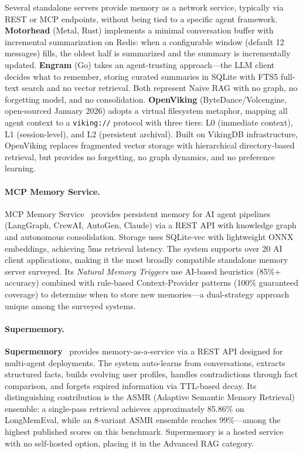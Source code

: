 Several standalone servers provide memory as a network service,
typically via REST or MCP endpoints, without being tied to a specific
agent framework. \textbf{Motorhead} (Metal, Rust) implements a
minimal conversation buffer with incremental summarization on Redis:
when a configurable window (default 12 messages) fills, the oldest
half is summarized and the summary is incrementally updated.
\textbf{Engram} (Go) takes an agent-trusting approach---the LLM
client decides what to remember, storing curated summaries in SQLite
with FTS5 full-text search and no vector retrieval. Both represent
Naive RAG with no graph, no forgetting model, and no consolidation.
\textbf{OpenViking} (ByteDance/Volcengine, open-sourced January 2026)
adopts a virtual filesystem metaphor, mapping all agent context to a
\texttt{viking://} protocol with three tiers: L0 (immediate context),
L1 (session-level), and L2 (persistent archival). Built on VikingDB
infrastructure, OpenViking replaces fragmented vector storage with
hierarchical directory-based retrieval, but provides no forgetting,
no graph dynamics, and no preference learning.

\paragraph{MCP Memory Service.}
MCP Memory Service~\cite{doobidoo2026mcp} provides persistent memory
for AI agent pipelines (LangGraph, CrewAI, AutoGen, Claude) via a REST
API with knowledge graph and autonomous consolidation.  Storage uses
SQLite-vec with lightweight ONNX embeddings, achieving 5ms retrieval
latency.  The system supports over 20 AI client applications, making it
the most broadly compatible standalone memory server surveyed.  Its
\emph{Natural Memory Triggers} use AI-based heuristics (85\%+ accuracy)
combined with rule-based Context-Provider patterns (100\% guaranteed
coverage) to determine when to store new memories---a dual-strategy
approach unique among the surveyed systems.

\paragraph{Supermemory.}
\textbf{Supermemory}~\cite{supermemory2026} provides memory-as-a-service
via a REST API designed for multi-agent deployments.  The system
auto-learns from conversations, extracts structured facts, builds
evolving user profiles, handles contradictions through fact comparison,
and forgets expired information via TTL-based decay.  Its distinguishing
contribution is the ASMR (Adaptive Semantic Memory Retrieval) ensemble:
a single-pass retrieval achieves approximately 85.86\% on LongMemEval,
while an 8-variant ASMR ensemble reaches 99\%---among the highest
published scores on this benchmark.  Supermemory is a hosted service
with no self-hosted option, placing it in the Advanced RAG category.

